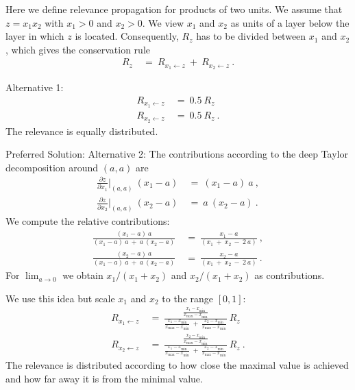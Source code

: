 \documentclass{article}
\begin{document}
\begin{appendices}
Here we define relevance propagation for products of two units.
We assume that $z= x_1  x_2$ with $x_1>0$ and $x_2>0$. 
We view $x_1$ and $x_2$ as units of a layer below the layer in
which $z$ is located. Consequently, $R_z$ has to be divided between $x_1$ and $x_2$,
which gives the conservation rule
\begin{align}
R_z  \ &= \    R_{x_1 \leftarrow z} \ + \ R_{x_2 \leftarrow z}   \ .
\end{align}


Alternative 1:
\begin{align}
  R_{x_1 \leftarrow z}   \ &= \  0.5 \ R_z \\
  R_{x_2 \leftarrow z}   \ &= \  0.5 \ R_z   \ .
\end{align}
The relevance is equally distributed.





\noindent Preferred Solution:\newline
Alternative 2:
The contributions according to the deep Taylor decomposition around
$(a,a)$ are
\begin{align}
  \frac{\partial z}{\partial x_1}\bigg\rvert_{(a,a)} \ (x_1 -a)   \ &= \ (x_1-a)  \ a  \ , \\
  \frac{\partial z}{\partial x_2}\bigg\rvert_{(a,a)} \ (x_2 -a)   \ &= \ a  \ (x_2-a) \ .
\end{align}
We compute the relative contributions:
\begin{align}
  \frac{(x_1-a)  \ a}{(x_1-a)  \ a \ + \ a  \ (x_2-a)}  \ &= \
  \frac{x_1-a}{(x_1\ + \ x_2 \ - \ 2 \ a)}  \ , \\
  \frac{(x_2-a)  \ a}{(x_1-a)  \ a \ + \ a  \ (x_2-a)}  \ &= \
  \frac{x_2-a}{(x_1\ + \ x_2 \ - \ 2 \ a)}  \ .
\end{align}
For $\lim_{a\to 0}$ we obtain $x_1/(x_1+x_2)$ and $x_2/(x_1+x_2)$
as contributions.


We use this idea but scale $x_1$ and $x_2$ to the range $[0,1]$:
\begin{align}
  R_{x_1 \leftarrow z}   \ &= \
  \frac{\frac{x_1-x_{\min}}{x_{\max}-x_{\min}}}{\frac{x_1-x_{\min}}{x_{\max}-x_{\min}}  \ + \ \frac{x_2-x_{\min}}{x_{\max}-x_{\min}}} \ R_z \\
  R_{x_2 \leftarrow z}   \ &= \
  \frac{\frac{x_2-x_{\min}}{x_{\max}-x_{\min}}}{\frac{x_1-x_{\min}}{x_{\max}-x_{\min}}
                             \ + \  \frac{x_2-x_{\min}}{x_{\max}-x_{\min}}} \ R_z  \ .
\end{align}
The relevance is distributed according to how close the maximal value
is achieved and how far away it is from the minimal value. 





\end{appendices}
\end{document}
